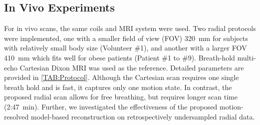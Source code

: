 \documentclass[journal,twoside,web]{ieeecolor}
\begin{document}
\subsection{In Vivo Experiments}

For in vivo scans, the same coils and MRI system were used. 
Two radial protocols were implemented, one with a smaller field of view (FOV) 
\SI{320}{\milli\meter} for subjects with relatively small body size (Volunteer \#1), 
and another with a larger FOV \SI{410}{\milli\meter} 
which fits well for obese patients (Patient \#1 to \#9).
Breath-hold multi-echo Cartesian Dixon MRI was used as the reference. 
Detailed parameters are provided in \cref{TAB:Protocol}. 
Although the Cartesian scan requires one single breath hold 
and is fast, it captures only one motion state. 
In contrast, the proposed radial scan allows for free breathing, 
but requires longer scan time (2:47~\si{\minute}). 
Further, we investigated the effectiveness of 
the proposed motion-resolved model-based reconstruction 
on retrospectively undersampled radial data.
\end{document}
